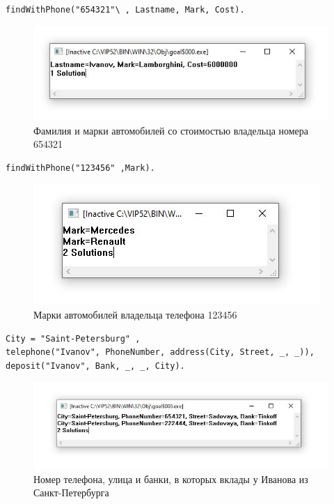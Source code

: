 \begin{lstlisting}[caption=Первый тест]
findWithPhone("654321"\ , Lastname, Mark, Cost).
\end{lstlisting}

\begin{figure}[H]
    \centering
    \includegraphics[scale=0.9]{img/1.jpg}
    \caption{Фамилия и марки автомобилей со стоимостью владельца номера 654321}
\end{figure}

\begin{lstlisting}[caption=Второй тест]
findWithPhone("123456" ,Mark).
\end{lstlisting}

\begin{figure}[H]
    \centering
    \includegraphics[scale=0.9]{img/2.jpg}
    \caption{Марки автомобилей владельца телефона 123456}
\end{figure}

\begin{lstlisting}[caption=Третий тест]
City = "Saint-Petersburg" ,
telephone("Ivanov", PhoneNumber, address(City, Street, _, _)),
deposit("Ivanov", Bank, _, _, City).
\end{lstlisting}

\begin{figure}[H]
    \centering
    \includegraphics[scale=0.7]{img/3.jpg}
    \caption{Номер телефона, улица и банки, в которых вклады у Иванова из Санкт-Петербурга}
\end{figure}


